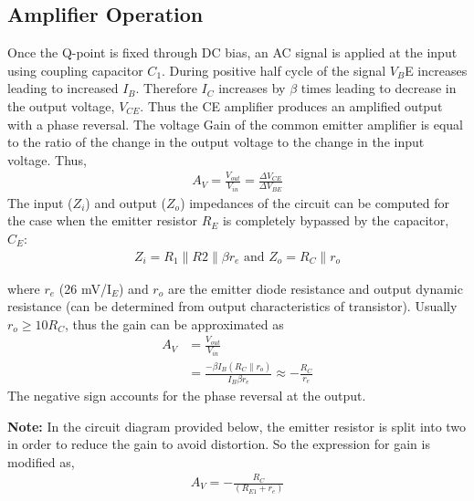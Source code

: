 \subsection*{Amplifier Operation}

Once the Q-point is fixed through DC bias, an AC signal is applied at the input using
coupling capacitor $C_1$. During positive half cycle of the signal $V_B$E increases leading to
increased $I_B$. Therefore $I_C$ increases by $\beta$ times leading to decrease in the output voltage, $V_{CE}$. Thus the CE amplifier produces an amplified output with a phase reversal. The
voltage Gain of the common emitter amplifier is equal to the ratio of the change in the
output voltage to the change in the input voltage. Thus,
\begin{align}
A_V = \frac{V_{out}}{V_{in}} = \frac{\Delta V_{CE}}{\Delta V_{BE}}
\end{align}
The input ($Z_i$) and output ($Z_o$) impedances of the circuit can be computed for the case
when the emitter resistor $R_E$ is completely bypassed by the capacitor, $C_E$:
\begin{align}
    Z_i = R_1 \parallel R2 \parallel \beta r_e \text{ and } Z_o = R_C \parallel r_o
\end{align}
    
where $r_e$ (26 mV/I$_E$) and $r_o$ are the emitter diode resistance and output dynamic resistance
(can be determined from output characteristics of transistor). Usually $r_o \ge 10 R_C$, thus the
gain can be approximated as
\begin{align}
    A_V &= \frac{V_{out}}{V_{in}} \nonumber\\
    &= \frac{-\beta I_B (R_C \parallel r_o)}{I_B \beta r_e} \approx -\frac{R_C}{r_e}
\end{align}
The negative sign accounts for the phase reversal at the output.

\textbf{Note:} In the circuit diagram provided below, the emitter resistor is split into two in order
to reduce the gain to avoid distortion. So the expression for gain is modified as,
\begin{align}
    A_V = -\frac{R_C}{(R_{E1}+r_e)}
\end{align}

